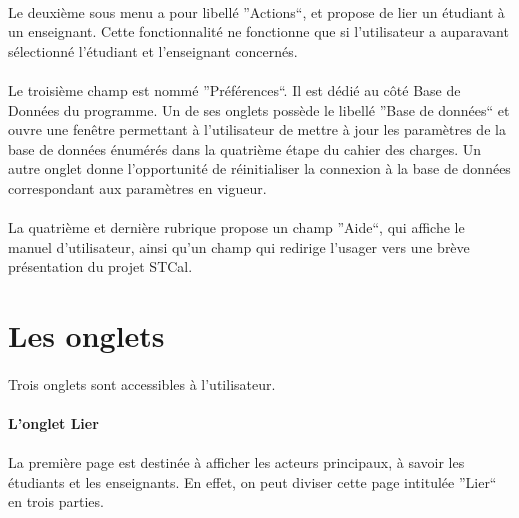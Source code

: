 \documentclass[a4paper,10pt]{report}
\begin{document}
	  \paragraph{}
	    Le deuxième sous menu a pour libellé ''Actions``, et propose de lier un étudiant à un enseignant. 
	    Cette fonctionnalité ne fonctionne que si l'utilisateur a auparavant sélectionné l'étudiant et l'enseignant concernés.
	  \paragraph{}
	    Le troisième champ est nommé ''Préférences``.
	    Il est dédié au côté Base de Données du programme.
	    Un de ses onglets possède le libellé ''Base de données`` et ouvre une fenêtre permettant à l'utilisateur de mettre à jour les paramètres de la base de données énumérés dans la quatrième étape du cahier des charges. 
	    Un autre onglet donne l'opportunité de réinitialiser la connexion à la base de données correspondant aux paramètres en vigueur.
	  \paragraph{}
	    La quatrième et dernière rubrique propose un champ ''Aide``, qui affiche le manuel d'utilisateur, ainsi qu'un champ qui redirige l'usager vers une brève présentation du projet STCal. 
      
        \section{Les onglets}
	  
	  \paragraph{}
	    Trois onglets sont accessibles à l'utilisateur.
	  
	  \paragraph{L'onglet Lier}
	    \paragraph{}
	      La première page est destinée à afficher les acteurs principaux, à savoir les étudiants et les enseignants. 
	      En effet, on peut diviser cette page intitulée ''Lier`` en trois parties.
	      
\end{document}
